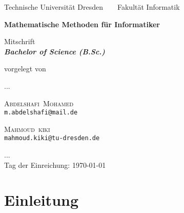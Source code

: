 \documentclass[a4paper,12pt,leqno]{report}
\makeatletter
\theoremstyle{plain} %
\theoremstyle{definition} %
\newcommand{\nameE}{Mohamed}
\newcommand{\vornameE}{Abdelshafi}
\newcommand{\emailE}{m.abdelshafi@mail.de}
\newcommand{\nameS}{kiki}
\newcommand{\vornameS}{Mahmoud}
\newcommand{\emailS}{mahmoud.kiki@tu-dresden.de}
\newcommand{\thema}{Mathematische Methoden für Informatiker}
\newcommand{\datum}{\today}%
\makeatother
\begin{document}




    \thispagestyle{empty}

    \begin{center}
    {\Large
    Technische Universit\"{a}t Dresden\  \ \textbullet\ \ Fakult\"{a}t Informatik
    }

        \vfil

        {\bfseries\Huge\thema}

        \vfil

        {\LARGE
        Mitschrift \\[\bigskipamount]

        \bfseries{\itshape Bachelor of Science  \textup{(}B.Sc.\textup{)}}\\[\bigskipamount]
        }%

        \vfil\vfil\vfil

        vorgelegt von\\
        \item ... \\
        \item \textsc{\vornameE\ \nameE } \\ \texttt{\emailE} \\  \item
        \textsc{\vornameS\ \nameS \qquad } \\ \texttt{\emailS}  \\
        \item ... \\
        Tag der Einreichung: \datum\\[\bigskipamount]

    \end{center}

    \cleardoublepage



    \tableofcontents

    \thispagestyle{empty}



    \setcounter{page}{0}
    \chapter*{Einleitung}
\end{document}
